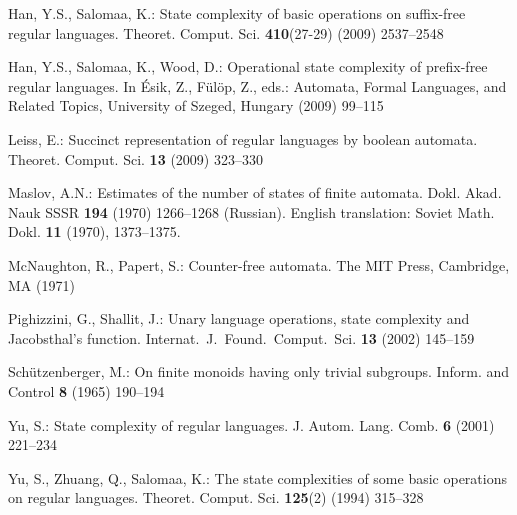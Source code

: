 \documentclass{llncs}
\begin{document}
\begin{thebibliography}{10}
Han, Y.S., Salomaa, K.:
\newblock State complexity of basic operations on suffix-free regular
  languages.
\newblock Theoret. Comput. Sci. \textbf{410}(27-29) (2009)  2537--2548

Han, Y.S., Salomaa, K., Wood, D.:
\newblock Operational state complexity of prefix-free regular languages.
\newblock In {\'E}sik, Z., F{\"u}l{\"o}p, Z., eds.: Automata, Formal Languages,
  and Related Topics, University of Szeged, Hungary (2009)  99--115

Leiss, E.:
\newblock Succinct representation of regular languages by boolean automata.
\newblock Theoret. Comput. Sci. \textbf{13} (2009)  323--330

Maslov, A.N.:
\newblock Estimates of the number of states of finite automata.
\newblock Dokl. Akad. Nauk SSSR \textbf{194} (1970)  1266--1268 (Russian).
  English translation: Soviet Math. Dokl. {\bf 11} (1970), 1373--1375.

McNaughton, R., Papert, S.:
\newblock Counter-free automata.
\newblock The MIT Press, Cambridge, MA (1971)

Pighizzini, G., Shallit, J.:
\newblock Unary language operations, state complexity and \mbox{Jacobsthal's}
  function.
\newblock Internat.\ J.\ Found.\ Comput.\ Sci. \textbf{13} (2002)  145--159

Sch\"utzenberger, M.:
\newblock On finite monoids having only trivial subgroups.
\newblock Inform. and Control \textbf{8} (1965)  190--194

Yu, S.:
\newblock State complexity of regular languages.
\newblock J. Autom. Lang. Comb. \textbf{6} (2001)  221--234

Yu, S., Zhuang, Q., Salomaa, K.:
\newblock The state complexities of some basic operations on regular languages.
\newblock Theoret. Comput. Sci. \textbf{125}(2) (1994)  315--328

\end{thebibliography}
\end{document}
